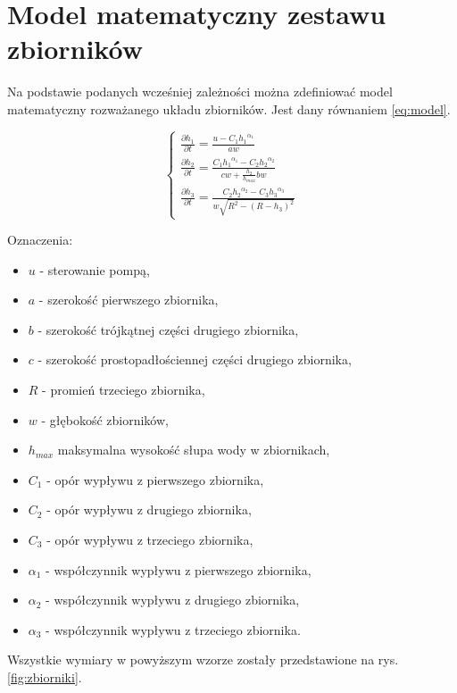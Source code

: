 \section{Model matematyczny zestawu zbiorników}
\label{sec:model}

Na podstawie podanych wcześniej zależności można zdefiniować model matematyczny rozważanego układu zbiorników.
Jest dany równaniem \ref{eq:model}.

\begin{equation}\label{eq:model}
\left \{
\begin{array}{lr}
\frac{\partial h_{1}}{\partial t} = \frac{u - C_{1}{h_{1}}^{\alpha_{1}}}{aw} \\[8pt]
\frac{\partial h_{2}}{\partial t} = \frac{C_{1}{h_{1}}^{\alpha_{1}} -  C_{2}{h_{2}}^{\alpha_{2}}}{cw + \frac{h_{2}}{h_{max}}bw} \\[20pt]
\frac{\partial h_{3}}{\partial t} = \frac{C_{2}{h_{2}}^{\alpha_{2}} -  C_{3}{h_{3}}^{\alpha_{3}}}{w\sqrt{R^{2} - (R - h_{3})^{2}}}
\end{array}
\right.
\end{equation}

Oznaczenia:
\begin{itemize}
    \item $u$ - sterowanie pompą,
    \item $a$ - szerokość pierwszego zbiornika,
    \item $b$ - szerokość trójkątnej części drugiego zbiornika,
    \item $c$ - szerokość prostopadłościennej części drugiego zbiornika,
    \item $R$ - promień trzeciego zbiornika,
    \item $w$ - głębokość zbiorników,
    \item $h_{max}$ maksymalna wysokość słupa wody w zbiornikach,
    \item $C_{1}$ - opór wypływu z pierwszego zbiornika,
    \item $C_{2}$ - opór wypływu z drugiego zbiornika,
    \item $C_{3}$ - opór wypływu z trzeciego zbiornika,
    \item $\alpha_{1}$ - współczynnik wypływu z pierwszego zbiornika,
    \item $\alpha_{2}$ - współczynnik wypływu z drugiego zbiornika,
    \item $\alpha_{3}$ - współczynnik wypływu z trzeciego zbiornika.
\end{itemize}
Wszystkie wymiary w powyższym wzorze zostały przedstawione na rys. \ref{fig:zbiorniki}.
